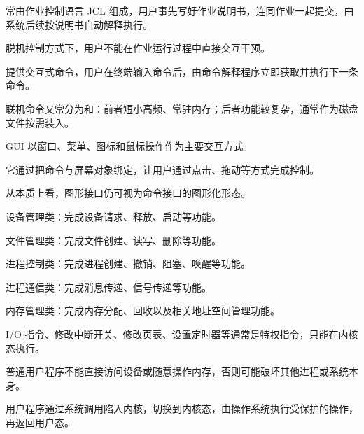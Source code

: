 \begin{points}
  \item {}常由作业控制语言 JCL 组成，用户事先写好作业说明书，连同作业一起提交，由系统后续按说明书自动解释执行。
  \item 脱机控制方式下，用户不能在作业运行过程中直接交互干预。
  \item {}提供交互式命令，用户在终端输入命令后，由命令解释程序立即获取并执行下一条命令。
  \item 联机命令又常分为和：前者短小高频、常驻内存；后者功能较复杂，通常作为磁盘文件按需装入。
\end{points}


\begin{points}
  \item GUI 以窗口、菜单、图标和鼠标操作作为主要交互方式。
  \item 它通过把命令与屏幕对象绑定，让用户通过点击、拖动等方式完成控制。
  \item 从本质上看，图形接口仍可视为命令接口的图形化形态。
\end{points}


\begin{points}
  \item 设备管理类：完成设备请求、释放、启动等功能。
  \item 文件管理类：完成文件创建、读写、删除等功能。
  \item 进程控制类：完成进程创建、撤销、阻塞、唤醒等功能。
  \item 进程通信类：完成消息传递、信号传递等功能。
  \item 内存管理类：完成内存分配、回收以及相关地址空间管理功能。
\end{points}

\begin{points}
  \item I/O 指令、修改中断开关、修改页表、设置定时器等通常是特权指令，只能在内核态执行。
  \item 普通用户程序不能直接访问设备或随意操作内存，否则可能破坏其他进程或系统本身。
  \item 用户程序通过系统调用陷入内核，切换到内核态，由操作系统执行受保护的操作，再返回用户态。
\end{points}


